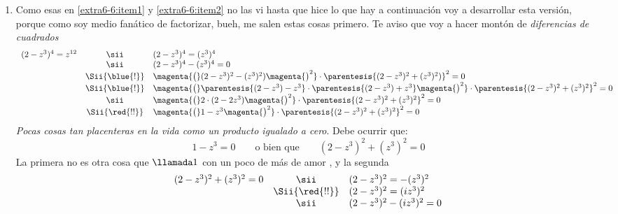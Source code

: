 \begin{enumerate}[label=\faIcon{magic}$_{\arabic*}$)]
  \item\label{extra6-6:item3} Como esas en \ref{extra6-6:item1} y \ref{extra6-6:item2} no las vi hasta que hice lo que hay
        a continuación voy a desarrollar esta versión, porque como soy medio fanático de factorizar,
        bueh, me salen estas cosas primero.
        Te aviso que voy a hacer montón de \textit{diferencias de cuadrados\blue{!}}
        $$
          \begin{array}{rcl}
            (2-z^3)^4 = z^{12}
             & \sii           &
            (2-z^3)^4 = (z^3)^4     \\
             & \sii           &
            (2-z^3)^4 - (z^3)^4 = 0 \\
             & \Sii{\blue{!}} &
            \magenta{\big(}
            (2-z^3)^2 - (z^3)^2 )
            \magenta{\big)^2}
            \cdot
            \parentesis{(2-z^3)^2 + (z^3)^2)}^2
            = 0                     \\
             & \Sii{\blue{!}} &
            \magenta{\big(}\parentesis{(2-z^3) - z^3}
            \cdot
            \parentesis{(2-z^3) + z^3}
            \magenta{\big)^2}
            \cdot
            \parentesis{(2-z^3)^2 + (z^3)^2}^2
            = 0                     \\
             & \sii           &
            \magenta{\big(}
            2 \cdot (2-2z^3)
            \magenta{\big)^2}
            \cdot
            \parentesis{(2-z^3)^2 + (z^3)^2}^2
            = 0                     \\
             & \Sii{\red{!!}} &
            \magenta{\big(}
            1 - z^3
            \magenta{\big)^2}
            \cdot
            \parentesis{(2-z^3)^2 + (z^3)^2}^2
            = 0
          \end{array}
        $$
        \textit{Pocas cosas tan placenteras en la vida como un producto igualado a cero}. Debe ocurrir que:
        $$
          1 - z^3 = 0
          \qquad \text{o bien que} \qquad
          (2-z^3)^2 + (z^3)^2 = 0
        $$
        La primera no es otra cosa que $\llamada1$ con un poco de más de amor {\tiny{}},
        y la segunda
        $$
          \begin{array}{rcl}
            (2-z^3)^2 + (z^3)^2 = 0
             & \sii           &
            (2 - z^3)^2  = - (z^3)^2    \\
             & \Sii{\red{!!}} &
            (2 - z^3)^2  = (iz^3)^2     \\
             & \sii           &
            (2 - z^3)^2  - (iz^3)^2 = 0 \\

\end{array}$$
\end{enumerate}
